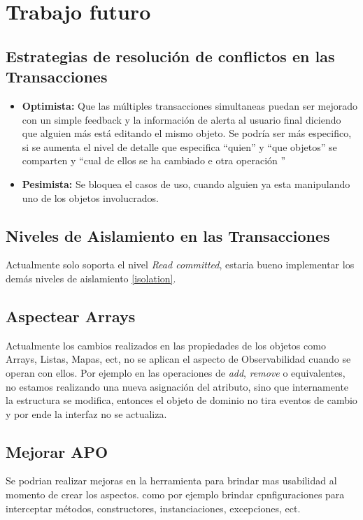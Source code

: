 
\section{Trabajo futuro}
\label{sec:futurework}


	\subsection{Estrategias de resolución de conflictos en las Transacciones}
	
		\begin{itemize}
	
			\item{\bf Optimista:} Que las múltiples  transacciones simultaneas puedan ser
			mejorado con un simple feedback y la información de alerta al
			usuario final diciendo que alguien más está editando el mismo objeto.
			Se podría ser más especifico, si se aumenta el nivel de detalle que especifica
			``quien'' y ``que objetos'' se comparten y ``cual de ellos se ha cambiado e
			otra operación ''
		
			\item{\bf Pesimista:} Se  bloquea el casos de uso, cuando alguien ya esta
			manipulando uno de los objetos involucrados. 
	
		\end{itemize}
		
	\subsection{Niveles de Aislamiento en las Transacciones}
	Actualmente solo soporta el nivel \emph{Read committed}, estaria bueno
	implementar los demás niveles de aislamiento \ref{isolation}.
	
	\subsection{Aspectear Arrays}
		Actualmente los cambios realizados en las propiedades de los objetos como
		Arrays, Listas, Mapas, ect, no se aplican el aspecto de Observabilidad cuando
		se operan con ellos. Por ejemplo en las operaciones de \emph{add}, \emph{remove} o
		equivalentes, no estamos realizando una nueva asignación del atributo, sino
		que internamente la estructura se modifica, entonces el objeto de dominio no
		tira eventos de cambio y por ende la interfaz no se actualiza.
		
	\subsection{Mejorar APO}
		Se podrian realizar mejoras en la herramienta para brindar mas usabilidad al
		momento de crear los aspectos. como por ejemplo brindar cpnfiguraciones para
		interceptar métodos, constructores, instanciaciones, excepciones, ect.
		 
